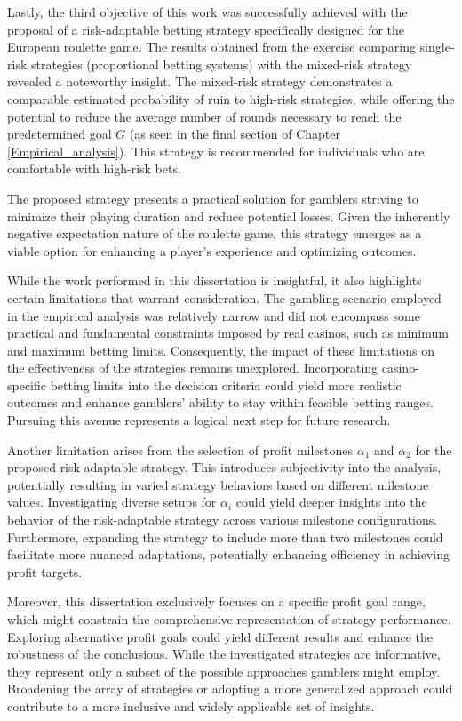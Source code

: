 \documentclass[11pt,twoside]{article}
\numberwithin{Theorem}{section}
\numberwithin{Definition}{section}
\numberwithin{Lemma}{section}
\numberwithin{Algorithm}{section}
\numberwithin{equation}{section}
\begin{document}
Lastly, the third objective of this work was successfully achieved with the proposal of a risk-adaptable betting strategy specifically designed for the European roulette game. The results obtained from the exercise comparing single-risk strategies (proportional betting systems) with the mixed-risk strategy revealed a noteworthy insight. The mixed-risk strategy demonstrates a comparable estimated probability of ruin to high-risk strategies, while offering the potential to reduce the average number of rounds necessary to reach the predetermined goal $G$ (as seen in the final section of Chapter \ref{Empirical_analysis}). This strategy is recommended for individuals who are comfortable with high-risk bets.

The proposed strategy presents a practical solution for gamblers striving to minimize their playing duration and reduce potential losses. Given the inherently negative expectation nature of the roulette game, this strategy emerges as a viable option for enhancing a player’s experience and optimizing outcomes.

While the work performed in this dissertation is insightful, it also highlights certain limitations that warrant consideration. The gambling scenario employed in the empirical analysis was relatively narrow and did not encompass some practical and fundamental constraints imposed by real casinos, such as minimum and maximum betting limits. Consequently, the impact of these limitations on the effectiveness of the strategies remains unexplored. Incorporating casino-specific betting limits into the decision criteria could yield more realistic outcomes and enhance gamblers' ability to stay within feasible betting ranges. Pursuing this avenue represents a logical next step for future research.

Another limitation arises from the selection of profit milestones $\alpha_{1}$ and $\alpha_{2}$ for the proposed risk-adaptable strategy. This introduces subjectivity into the analysis, potentially resulting in varied strategy behaviors based on different milestone values. Investigating diverse setups for $\alpha_{i}$ could yield deeper insights into the behavior of the risk-adaptable strategy across various milestone configurations. Furthermore, expanding the strategy to include more than two milestones could facilitate more nuanced adaptations, potentially enhancing efficiency in achieving profit targets.

Moreover, this dissertation exclusively focuses on a specific profit goal range, which might constrain the comprehensive representation of strategy performance. Exploring alternative profit goals could yield different results and enhance the robustness of the conclusions. While the investigated strategies are informative, they represent only a subset of the possible approaches gamblers might employ. Broadening the array of strategies or adopting a more generalized approach could contribute to a more inclusive and widely applicable set of insights.
\end{document}
